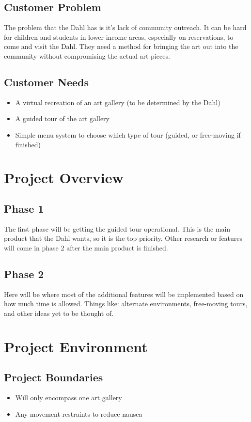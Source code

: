 \subsection*{Customer Problem}
The problem that the Dahl has is it's lack of community outreach.  It can be hard for children and students in lower income areas, especially on reservations, to come and visit the Dahl.  They need a method for bringing the art out into the community without compromising the actual art pieces.

\subsection*{Customer Needs}
\begin{itemize}
\item A virtual recreation of an art gallery (to be determined by the Dahl)
\item A guided tour of the art gallery
\item Simple menu system to choose which type of tour (guided, or free-moving if finished)
\end{itemize}

\section*{Project Overview}
\hrulefill
\subsection*{Phase 1}
The first phase will be getting the guided tour operational.  This is the main product that the Dahl wants, so it is the top priority.  Other research or features will come in phase 2 after the main product is finished.

\subsection*{Phase 2}
Here will be where most of the additional features will be implemented based on how much time is allowed.  Things like: alternate environments, free-moving tours, and other ideas yet to be thought of.

\section*{Project Environment}
\hrulefill
\subsection*{Project Boundaries}
\begin{itemize}
\item Will only encompass one art gallery
\item Any movement restraints to reduce nausea
\end{itemize}

